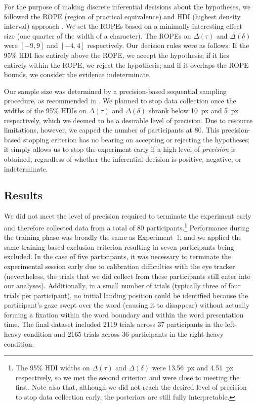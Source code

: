 \documentclass[doc,biblatex]{apa7}
\begin{document}
For the purpose of making discrete inferential decisions about the hypotheses, we followed the ROPE (region of practical equivalence) and HDI (highest density interval) approach \parencite{Kruschke:2015}. We set the ROPEs based on a minimally interesting effect size (one quarter of the width of a character). The ROPEs on $\Delta(\tau)$ and $\Delta(\delta)$ were $[-9, 9]$ and $[-4, 4]$ respectively. Our decision rules were as follows: If the 95\% HDI lies entirely above the ROPE, we accept the hypothesis; if it lies entirely within the ROPE, we reject the hypothesis; and if it overlaps the ROPE bounds, we consider the evidence indeterminate.

Our sample size was determined by a precision-based sequential sampling procedure, as recommended in \textcite{Kruschke:2015}. We planned to stop data collection once the widths of the 95\% HDIs on $\Delta(\tau)$ and $\Delta(\delta)$ shrank below 10~px and 5~px respectively, which we deemed to be a desirable level of precision. Due to resource limitations, however, we capped the number of participants at 80. This precision-based stopping criterion has no bearing on accepting or rejecting the hypotheses; it simply allows us to stop the experiment early if a high level of \textit{precision} is obtained, regardless of whether the inferential decision is positive, negative, or indeterminate.

\subsection{Results}

We did not meet the level of precision required to terminate the experiment early and therefore collected data from a total of 80 participants.\footnote{The 95\% HDI widths on $\Delta(\tau)$ and $\Delta(\delta)$ were 13.56~px and 4.51~px respectively, so we met the second criterion and were close to meeting the first. Note also that, although we did not reach the desired level of precision to stop data collection early, the posteriors are still fully interpretable.} Performance during the training phase was broadly the same as Experiment~1, and we applied the same training-based exclusion criterion resulting in seven participants being excluded. In the case of five participants, it was necessary to terminate the experimental session early due to calibration difficulties with the eye tracker (nevertheless, the trials that we did collect from these participants still enter into our analyses). Additionally, in a small number of trials (typically three of four trials per participant), no initial landing position could be identified because the participant's gaze swept over the word (causing it to disappear) without actually forming a fixation within the word boundary and within the word presentation time. The final dataset included 2119 trials across 37 participants in the left-heavy condition and 2165 trials across 36 participants in the right-heavy condition.
\end{document}
